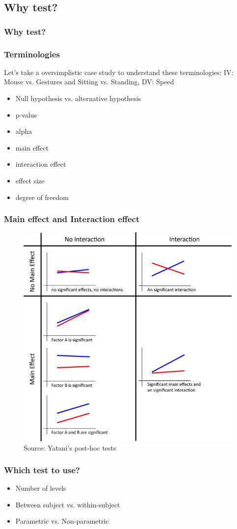 \documentclass{beamer}
\begin{document}
\subsection{Why test?}

\begin{frame}
	\frametitle{Why test?}
\end{frame}

\begin{frame}
	\frametitle{Terminologies }
	Let's take a oversimplistic case study to understand these terminologies:  IV:  Mouse vs. Gestures and Sitting vs. Standing,  DV:  Speed
	\begin{itemize}	
		\item Null hypothesis vs. alternative hypothesis
		\item p-value
		\item alpha
		\item main effect
		\item interaction effect	
		\item effect size
		\item degree of freedom
	\end{itemize}
\end{frame}

\begin{frame}
	\frametitle{Main effect and Interaction effect} 
		\begin{figure}
		\includegraphics[width=0.5\linewidth]{interactions}
		\caption{Source: Yatani's post-hoc tests}
	\end{figure}
\end{frame}

\begin{frame}
	\frametitle{Which test to use?}
	\begin{itemize}
		\item Number of levels
		\item Between subject vs. within-subject
		\item Parametric vs. Non-parametric
	\end{itemize}
\end{frame}
\end{document}
